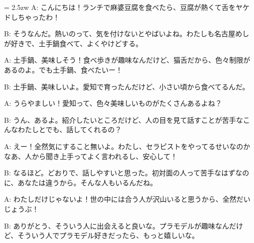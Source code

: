 \documentclass[11pt]{amsart}
\title{}
\author{}
\newenvironment{hangall}[1]{\hangindent = 2.5zw\everypar{\hangindent = 2.5zw}}{}
\begin{document}
\maketitle
\begin{hangall}{}%
A: こんにちは！ランチで麻婆豆腐を食べたら、豆腐が熱くて舌をヤケドしちゃったわ！

B: そうなんだ。熱いのって、気を付けないとやばいよね。わたしも名古屋めしが好きで、土手鍋食べて、よくやけどする。

A: 土手鍋、美味しそう！食べ歩きが趣味なんだけど、猫舌だから、色々制限があるのよ。でも土手鍋、食べたいー！

B: 土手鍋、美味しいよ。愛知で育ったんだけど、小さい頃から食べてるんだ。

A: うらやましい！愛知って、色々美味しいものがたくさんあるよね？

B: うん、あるよ。紹介したいところだけど、人の目を見て話すことが苦手なこんなわたしとでも、話してくれるの？

A: えー！全然気にすること無いよ。わたし、セラピストをやってるせいなのかなあ、人から聞き上手ってよく言われるし、安心して！

B: なるほど。どおりで、話しやすいと思った。初対面の人って苦手なはずなのに、あなたは違うから。そんな人もいるんだね。

A: わたしだけじゃないよ！世の中には合う人が沢山いると思うから、全然だいじょうぶ！

B: ありがとう、そういう人に出会えると良いな。プラモデルが趣味なんだけど、そういう人でプラモデル好きだったら、もっと嬉しいな。
\end{hangall}
\end{document}
